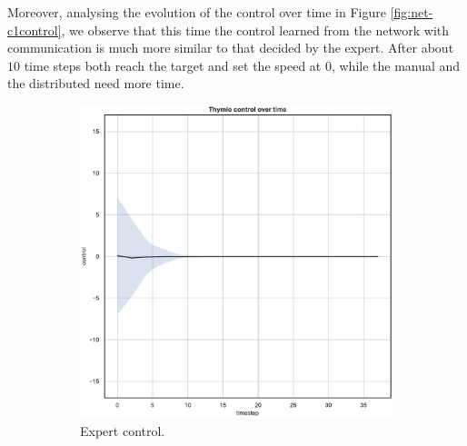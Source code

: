 Moreover, analysing the evolution of the control over time in Figure 
\ref{fig:net-c1control}, we observe that this time the control learned from the 
network with communication is much more similar to that decided by the expert.
After about $10$ time steps both reach the target and set the speed at $0$, while 
the manual and the distributed need more time.
\begin{figure}[!htb]
	\begin{center}
		\begin{subfigure}[h]{0.35\textwidth}
			\includegraphics[width=\textwidth]{contents/images/net-d1/control-overtime-omniscient}%
			\caption{Expert control.}
		\end{subfigure}
		\hspace{1cm}
		\begin{subfigure}[h]{0.35\textwidth}

\end{subfigure}
\end{center}
\end{figure}
